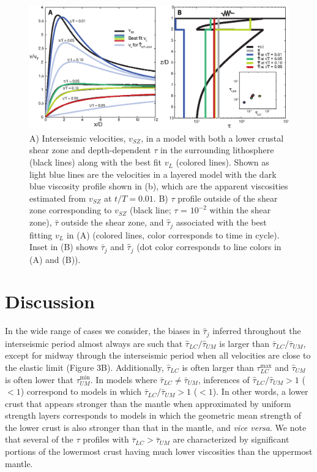 \begin{figure}\label{Fig4}
\includegraphics{ch1/figures/Figure4.eps}
\caption{A) Interseismic velocities, $v_{SZ}$, in a model with both a lower crustal shear zone and depth-dependent $\tau$ in the surrounding lithosphere (black lines) along with the best fit $v_{L}$ (colored lines).  Shown as light blue lines are the velocities in a layered model with the dark blue viscosity profile shown in (b), which are the apparent viscosities estimated from $v_{SZ}$ at $t/T = 0.01$.  B)  $\tau$ profile outside of the shear zone corresponding to $v_{SZ}$ (black line; $\tau$ = $10^{-2}$ within the shear zone), $\bar{\tau}$ outside the shear zone, and $\hat{\tau}_j$ associated with the best fitting $v_{L}$ in (A) (colored lines, color corresponds to time in cycle). Inset in (B) shows $\bar{\tau}_j$ and $\hat{\tau}_j$ (dot color corresponds to line colors in (A) and (B)).}
\end{figure}

\section{Discussion}
In the wide range of cases we consider, the biases in $\hat{\tau}_j$ inferred throughout the interseismic period almost always are such that $\hat{\tau}_{LC}/\hat{\tau}_{UM}$ is larger than $\bar{\tau}_{LC}/\bar{\tau}_{UM}$, except for midway through the interseismic period when all velocities are close to the elastic limit (Figure 3B).  Additionally, $\hat{\tau}_{LC}$ is often larger than $\tau^{\max}_{LC}$ and $\hat{\tau}_{UM}$ is often lower that $\tau^{\min}_{UM}$.  In models where $\bar{\tau}_{LC} \ne \bar{\tau}_{UM}$, inferences of $\hat{\tau}_{LC}/\hat{\tau}_{UM}>1$ ($<1$) correspond to models in which $\bar{\tau}_{LC}/\bar{\tau}_{UM}>1$ ($<1$). In other words, a lower crust that appears stronger than the mantle when approximated by uniform strength layers corresponds to models in which the geometric mean strength of the lower crust is also stronger than that in the mantle, and {\it vice versa}.  We note that several of the $\tau$ profiles with $\bar{\tau}_{LC} > \bar{\tau}_{UM}$ are characterized by significant portions of the lowermost crust having much lower viscosities than the uppermost mantle.

